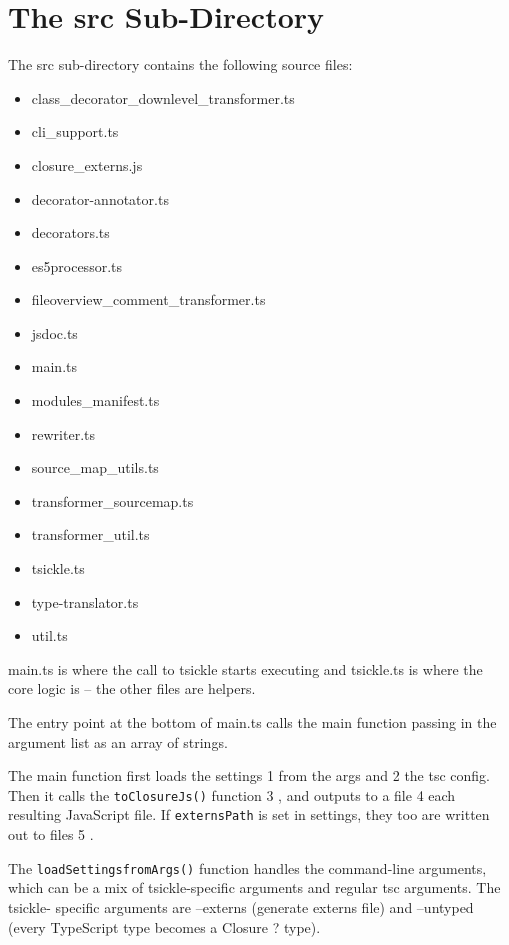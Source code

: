 \section{The src Sub-Directory}

The src sub-directory contains the following source files:

\begin{itemize}
  \item class\_decorator\_downlevel\_transformer.ts
  \item cli\_support.ts
  \item closure\_externs.js
  \item decorator-annotator.ts
  \item decorators.ts
  \item es5processor.ts
  \item fileoverview\_comment\_transformer.ts
  \item jsdoc.ts
  \item main.ts
  \item modules\_manifest.ts
  \item rewriter.ts
  \item source\_map\_utils.ts
  \item transformer\_sourcemap.ts
  \item transformer\_util.ts
  \item tsickle.ts
  \item type-translator.ts
  \item util.ts
\end{itemize}

main.ts is where the call to tsickle starts executing and tsickle.ts is where the core
logic is – the other files are helpers.

The entry point at the bottom of main.ts calls the main function passing in the
argument list as an array of strings.



The main function first loads the settings
1
from the args and
2
the tsc config. Then it
calls the
\texttt{toClosureJs()}
function
3
, and outputs to a file
4
each resulting JavaScript
file. If
\texttt{externsPath}
is set in settings, they too are written out to files
5
.

The
\texttt{loadSettingsfromArgs()}
function handles the command-line arguments, which
can be a mix of tsickle-specific arguments and regular tsc arguments. The tsickle-
specific arguments are –externs (generate externs file) and –untyped (every
TypeScript type becomes a Closure {?} type).

